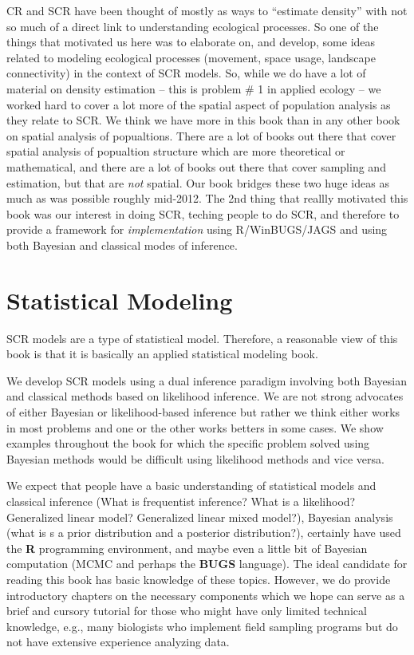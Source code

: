 CR and SCR have been thought of mostly as ways to ``estimate density''
with not so much of a direct link to understanding ecological
processes. So one of the things that motivated us here was to
elaborate on, and develop, some ideas related to modeling ecological
processes (movement, space usage, landscape connectivity) in the
context of SCR models.  So, while we do have a lot of material on
density estimation -- this is problem \# 1 in applied ecology -- we
worked hard to cover a lot more of the spatial aspect of population
analysis as they relate to SCR. We think we have more in this book
than in any other book on spatial analysis of popualtions. There are a
lot of books out there that cover spatial analysis of popualtion
structure which are more theoretical or mathematical, and there are a
lot of books out there that cover sampling and estimation, but that
are {\it not} spatial. Our book bridges these two huge ideas as much
as was possible roughly mid-2012.  The 2nd thing that reallly
motivated this book was our interest in doing SCR, teching people to
do SCR, and therefore to provide a framework for {\it implementation}
using R/WinBUGS/JAGS and using both Bayesian and classical modes of
inference.


\section*{Statistical Modeling}

SCR models are a type of statistical model. Therefore, a reasonable
view of this book is that it is basically an applied statistical
modeling book.

We develop SCR models using a dual inference paradigm involving both
Bayesian and classical methods based on likelihood inference.  We are
not strong advocates of either Bayesian or likelihood-based inference
but rather we think either works in most problems and one or the other
works betters in some cases.  We show examples throughout the book for
which the specific problem solved using Bayesian methods would be
difficult using likelihood methods and vice versa.

We expect that people have a basic understanding of statistical models
and classical inference (What is frequentist inference? What is a
likelihood? Generalized linear model? Generalized linear mixed
model?), Bayesian analysis (what is s a prior distribution and a
posterior distribution?), certainly have used the {\bf R} programming
environment, and maybe even a little bit of Bayesian computation (MCMC
and perhaps the \textbf{BUGS} language).  The ideal candidate for reading this
book has basic knowledge of these topics. However, we do provide
introductory chapters on the necessary components which we hope can
serve as a brief and cursory tutorial for those who might have only
limited technical knowledge, e.g., many biologists who implement field
sampling programs but do not have extensive experience analyzing data.


